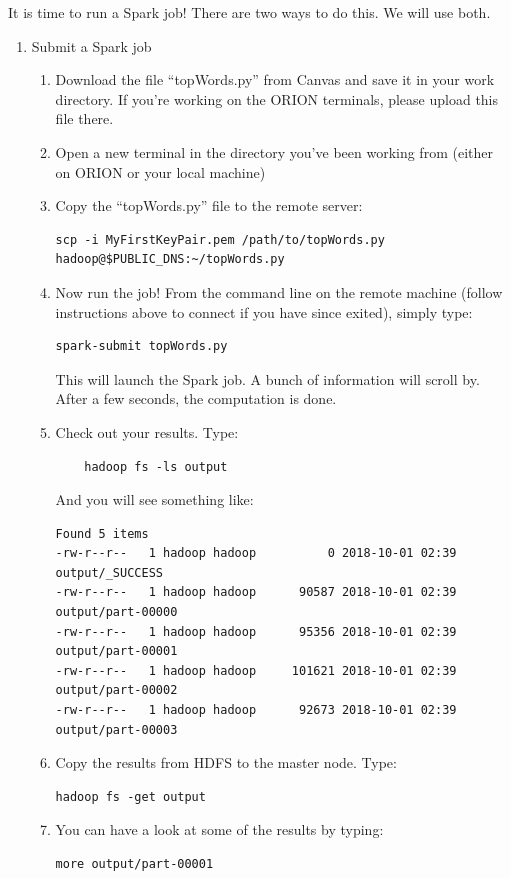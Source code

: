 \documentclass[11pt]{article}
\renewcommand\:{\colon} %
\begin{document}
It is time to run a Spark job!  There are two ways to do this. We will use both.


\begin{enumerate}
\item Submit a Spark job
\begin{enumerate}
  \item Download the file ``topWords.py'' from Canvas and save it in your work
    directory.  If you're working on the ORION terminals, please upload this
    file there.
  \item Open a new terminal in the directory you've been working from (either on ORION or your local machine)
  \item Copy the ``topWords.py'' file to the remote server:
\begin{footnotesize}
\begin{verbatim}
scp -i MyFirstKeyPair.pem /path/to/topWords.py hadoop@$PUBLIC_DNS:~/topWords.py
\end{verbatim}
\end{footnotesize}
  \item Now run the job! From the command line on the remote machine (follow
    instructions above to connect if you have since exited), simply type:
\begin{verbatim}
spark-submit topWords.py
\end{verbatim}
  This will launch the Spark job. A bunch of information will scroll by. After a
  few seconds, the computation is done.
\item Check out your results. Type:
  \begin{verbatim}
    hadoop fs -ls output
  \end{verbatim}
And you will see something like:
\begin{verbatim}
Found 5 items
-rw-r--r--   1 hadoop hadoop          0 2018-10-01 02:39 output/_SUCCESS
-rw-r--r--   1 hadoop hadoop      90587 2018-10-01 02:39 output/part-00000
-rw-r--r--   1 hadoop hadoop      95356 2018-10-01 02:39 output/part-00001
-rw-r--r--   1 hadoop hadoop     101621 2018-10-01 02:39 output/part-00002
-rw-r--r--   1 hadoop hadoop      92673 2018-10-01 02:39 output/part-00003
\end{verbatim}
\item Copy the results from HDFS to the master node. Type:

 \begin{verbatim}
hadoop fs -get output
\end{verbatim}

\item You can have a look at some of the results by typing:
 \begin{verbatim}
more output/part-00001
\end{verbatim}


\end{enumerate}
\end{enumerate}
\end{document}
